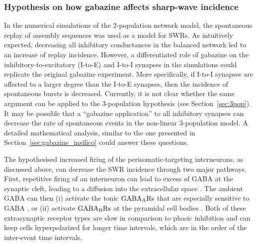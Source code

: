     \subsubsection{Hypothesis on how gabazine affects sharp-wave incidence} 
      In the numerical simulations of the 2-population network model, the
      spontaneous replay of assembly sequences was used as a model for SWRs. As
      intuitively expected, decreasing all inhibitory conductances in the
      balanced network led to an increase of replay incidence. However, a
      differentiated role of gabazine on the inhibitory-to-excitatory (I-to-E)
      and I-to-I synapses in the simulations could replicate the original
      gabazine experiment. More specifically, if I-to-I synapses are affected
      to a larger degree than the I-to-E synapses, then the incidence of
      spontaneous bursts is decreased. Currently, it is not clear whether the
      same argument can be applied to the 3-population hypothesis (see
      Section~\ref{sec:3pop}). It may be possible that a ``gabazine application''
      to all inhibitory synapses can decrease the rate of spontaneous events in
      the non-linear 3-population model. A detailed mathematical analysis,
      similar to the one presented in Section~\ref{sec:gabazine_insilico} could
      answer these questions.

      The hypothesised increased firing of the perisomatic-targeting
      interneurons, as discussed above, can decrease the SWR incidence through
      two major pathways. First, repetitive firing of an interneuron can lead
      to excess of GABA at the synaptic cleft, leading to a diffusion into the
      extracellular space \citep{Farrant2005}. The ambient GABA can then (i)
      activate the tonic $\rm GABA_ARs$ that are especially sensitive to GABA
      \citep{Semyanov2004}, or (ii) activate $\rm GABA_BRs$ at the pyramidal
      cell bodies \citep{Scanziani2000}. Both of these extrasynaptic receptor
      types are slow in comparison to phasic inhibition and can keep cells
      hyperpolarized for longer time intervals, which are in the order of the
      inter-event time intervals. 
      

